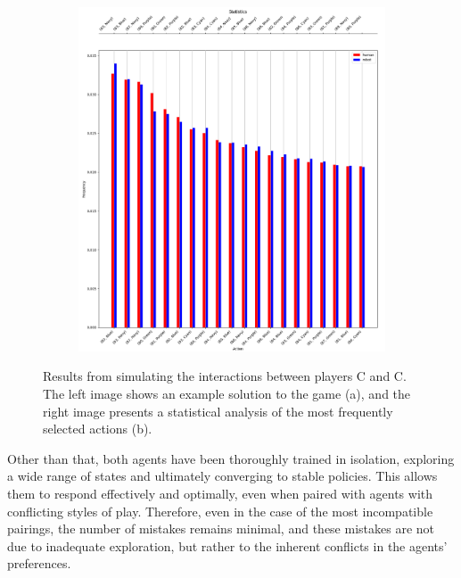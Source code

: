 \begin{flushleft}
\begin{flushleft}
\begin{figure}[H]
\begin{subfigure}[b]{0.45\textwidth}
                \includegraphics[width=\textwidth]{images/cc-stats.png}
                \caption{}
                \label{fig:cc-stats}
            \end{subfigure}
            \caption{Results from simulating the interactions between players C and C. The left image shows an example solution to the game (a), and the right image presents a statistical analysis of the most frequently selected actions (b).}
            \label{fig:cc-simulation}
        \end{figure}
        
        Other than that, both agents have been thoroughly trained in isolation, exploring a wide range of states and ultimately converging to stable policies. This allows them to respond effectively and optimally, even when paired with agents with conflicting styles of play. Therefore, even in the case of the most incompatible pairings, the number of mistakes remains minimal, and these mistakes are not due to inadequate exploration, but rather to the inherent conflicts in the agents’ preferences. 

    \end{flushleft}


\end{flushleft}
